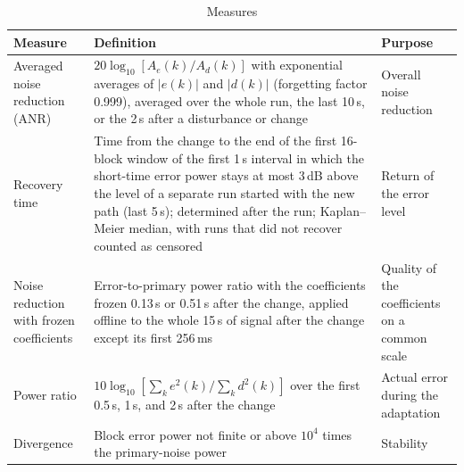 \begin{table}[tbp]
\centering
\footnotesize
\setlength{\tabcolsep}{4pt}
\caption{Measures}
\label{tab:atsip-11}
\begin{tabular}{>{\raggedright\arraybackslash}p{}>{\raggedright\arraybackslash}p{}>{\raggedright\arraybackslash}p{}}
\toprule
Measure & Definition & Purpose \\
\midrule
Averaged noise reduction (ANR) \cite{akhtar2009} & $20\log_{10}[A_e(k)/A_d(k)]$ with exponential averages of $|e(k)|$ and $|d(k)|$ (forgetting factor 0.999), averaged over the whole run, the last 10\,s, or the 2\,s after a disturbance or change & Overall noise reduction \\
Recovery time & Time from the change to the end of the first 16-block window of the first 1\,s interval in which the short-time error power stays at most 3\,dB above the level of a separate run started with the new path (last 5\,s); determined after the run; Kaplan--Meier median, with runs that did not recover counted as censored & Return of the error level \\
Noise reduction with frozen coefficients & Error-to-primary power ratio with the coefficients frozen 0.13\,s or 0.51\,s after the change, applied offline to the whole 15\,s of signal after the change except its first 256\,ms & Quality of the coefficients on a common scale \\
Power ratio & $10\log_{10}[\sum_k e^2(k)/\sum_k d^2(k)]$ over the first 0.5\,s, 1\,s, and 2\,s after the change & Actual error during the adaptation \\
Divergence & Block error power not finite or above $10^4$ times the primary-noise power & Stability \\
\bottomrule
\end{tabular}
\end{table}
